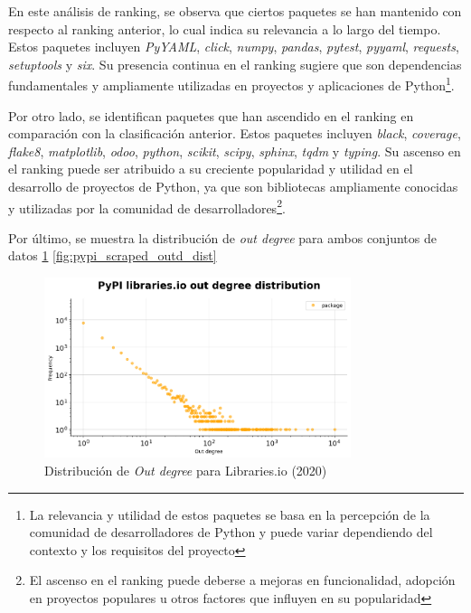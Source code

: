 En este análisis de ranking, se observa que ciertos paquetes se han mantenido con respecto al ranking
anterior, lo cual indica su relevancia a lo largo del tiempo. Estos
paquetes incluyen \textit{PyYAML}, \textit{click}, \textit{numpy}, \textit{pandas}, \textit{pytest},
\textit{pyyaml}, \textit{requests}, \textit{setuptools} y \textit{six}. Su presencia continua en el
ranking sugiere que son dependencias fundamentales y ampliamente utilizadas en proyectos y aplicaciones
de Python\footnote{La relevancia y utilidad de estos paquetes se basa en la percepción de la comunidad
    de desarrolladores de Python y puede variar dependiendo del contexto y los requisitos del proyecto}.

Por otro lado, se identifican paquetes que han ascendido en el ranking en comparación con la clasificación
anterior. Estos paquetes incluyen \textit{black}, \textit{coverage}, \textit{flake8}, \textit{matplotlib},
\textit{odoo}, \textit{python}, \textit{scikit}, \textit{scipy}, \textit{sphinx}, \textit{tqdm} y
\textit{typing}. Su ascenso en el ranking puede ser atribuido a su creciente popularidad y utilidad en el
desarrollo de proyectos de Python, ya que son bibliotecas ampliamente conocidas y utilizadas por la
comunidad de desarrolladores\footnote{El ascenso en el ranking puede deberse a mejoras en funcionalidad,
    adopción en proyectos populares u otros factores que influyen en su popularidad}.

Por último, se muestra la distribución de \textit{out degree} para ambos conjuntos de datos \ref{fig:pypi_libio_outd_dist} \ref{fig:pypi_scraped_outd_dist}

\begin{figure}[ht!]
    \begin{center}
        \includegraphics[width=0.8\textwidth]{img/pypi/outd_libio_dist.png}
        \caption{Distribución de \textit{Out degree} para Libraries.io (2020)}
        \label{fig:pypi_libio_outd_dist}
    \end{center}
\end{figure}

